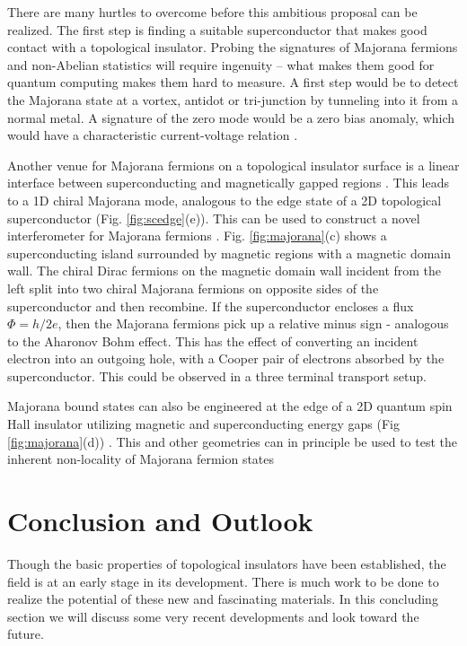 \documentclass[twocolumn,floatfix,showpacs,rmp,aps]{revtex4}
\begin{document}
	There are many hurtles to overcome before this ambitious proposal can be realized.
	The first step is finding a suitable superconductor that makes good
	contact with a topological insulator.  Probing the signatures of
	Majorana fermions and non-Abelian statistics will require ingenuity
	-- what makes them good for quantum computing makes them
	hard to measure.  A first step would be to detect the
	Majorana state at a vortex,  antidot or tri-junction by tunneling into
	it from a normal metal.  A signature of the zero mode would
	be a zero bias anomaly, which would have a characteristic
	current-voltage relation \cite{bolech07,law09}.
	
	Another venue for Majorana fermions on a topological insulator surface is a
	linear interface between superconducting and magnetically gapped regions
	\cite{fukane08,tanaka09,linder10}.  This
	leads to a 1D chiral Majorana mode, analogous to the edge state of
	a 2D topological superconductor (Fig. \ref{fig:scedge}(e)).  This can
	be used to construct a novel interferometer for Majorana
	fermions \cite{fukane09b,akhmerov09}.  Fig. \ref{fig:majorana}(c) shows a
	superconducting island surrounded by magnetic regions with a magnetic
	domain wall.  The chiral Dirac fermions on the magnetic domain wall
	incident from the left split into two chiral Majorana fermions on opposite sides of the
	superconductor and then recombine.  If the superconductor encloses a
	flux $\Phi=h/2e$, then the Majorana fermions pick up a relative minus
	sign - analogous to the Aharonov Bohm effect.  This has the effect of
	converting an incident electron into an outgoing hole, with a Cooper
	pair of electrons absorbed by the superconductor.  This could be
	observed in a three terminal transport setup.
	
	Majorana bound states can also be engineered at the edge of a 2D quantum spin Hall insulator
	utilizing magnetic and superconducting energy gaps
	(Fig \ref{fig:majorana}(d)) \cite{fukane09a,nilsson08}.  This and other geometries
	can in principle be used to test the inherent non-locality of Majorana fermion
	states \cite{fu10}
	
	\section{Conclusion and Outlook}
	\label{sec:outlook}
	
	Though the basic properties of topological insulators have been
	established, the field is at an early stage
	in its development.  There is much work to be done to
	realize the potential of these new and fascinating materials.
	In this concluding section we will discuss some very recent
	developments and look toward the future.
	
\end{document}

